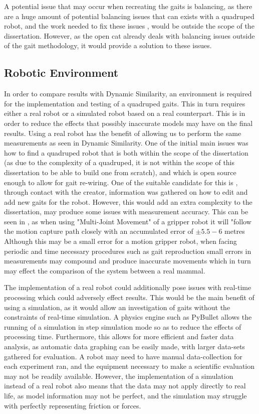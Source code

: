 A potential issue that may occur when recreating the gaits is balancing, as there are a huge amount of potential balancing issues that can exists with a quadruped robot, and the work needed to fix these issues \citep{Meng2015}, would be outside the scope of the dissertation. However, as the open cat already deals with balancing issues outside of the gait methodology, it would provide a solution to these issues.


\subsection{Robotic Environment}
In order to compare results with Dynamic Similarity, an environment is required for the implementation and testing of a quadruped gaits. This in turn requires either a real robot or a simulated robot based on a real counterpart. This is in  order to reduce the effects that possibly inaccurate models may have on the final results. Using a real robot has the benefit of allowing us to perform the same measurements as seen in Dynamic Similarity. One of the initial main issues was how to find a quadruped robot that is both within the scope of the dissertation (as due to the complexity of a quadruped, it is not within the scope of this dissertation to be able to build one from scratch), and which is open source enough to allow for gait re-wiring. One of the suitable candidate for this is \cite{Li2018}, through contact with the creator, information was gathered on how to edit and add new gaits for the robot. However, this would add an extra complexity to the dissertation,  may produce some issues with measurement accuracy.  This can be seen in \cite{Collins2018}, as when using "Multi-Joint Movement" of a gripper robot it will "follow the motion capture path closely with an accumulated  error of $\pm{5.5-6}$   metres  Although this may be a small error for a motion gripper robot, when facing periodic and time necessary procedures such as gait reproduction small errors in measurements may compound and produce inaccurate movements which in turn may effect the comparison of the system between a real mammal.

The implementation of a real robot could additionally pose issues with real-time processing which could adversely effect results. This would be the main benefit of using a simulation, as it would allow an investigation of gaits without the constraints of real-time simulation. A physics engine such as PyBullet allows the running of a simulation in step simulation mode so as to reduce the effects of processing time. Furthermore, this allows for more efficient and faster data analysis, as automatic data graphing can be easily made, with larger data-sets gathered for evaluation. A robot may need to have manual data-collection for each experiment ran, and the equipment necessary to make a scientific evaluation may not be readily available. However, the implementation of a simulation instead of a real robot also means that the data may not apply directly to real life,  as model information may not be perfect, and the simulation may struggle with perfectly representing friction or forces.  



